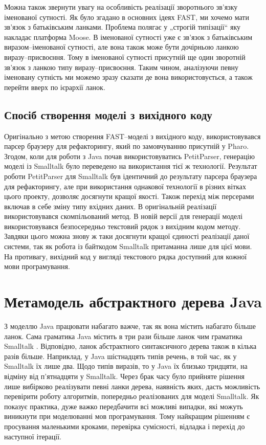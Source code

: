 \documentclass[12pt,a4paper]{article}
\begin{document}
Можна також звернути увагу на особливість реалізації зворотнього зв'язку іменованої сутності. Як було згадано в основних ідеях FAST, ми хочемо мати зв'язок з батьківським ланками. Проблема полягає у „строгій типізації“ яку накладає платформа Moose. В іменованої сутності уже є зв'язок з батьківським виразом--іменованої сутності, але вона також може бути дочірньою ланкою виразу--присвоєння. Тому в іменованої сутності присутній ще один зворотній зв'язок з ланкою типу виразу--присвоєння. Таким чином, аналізуючи певну іменовану сутність ми можемо зразу сказати де вона використовується, а також перейти вверх по ієрархії ланок. 

\subsection{Спосіб створення моделі з вихідного коду}
Оригінально з метою створення FAST--моделі з вихідного коду, використовувався парсер браузеру для рефакторингу, який по замовчуванню присутній у Pharo. Згодом, коли для роботи з Java почав використовуватись PetitParser, генерацію моделі із Smalltalk було переведено на використання тієї ж технології. Результат роботи PetitParser для Smalltalk був ідентичний до результату парсера браузера для рефакторингу, але при використання однакової технології в різних вітках цього проекту, дозволяє досягнути кращої якості. Також перехід між персерами включав в себе зміну типу вхідних даних. В оригінальній реалізації використовувався скомпільований метод. В новій версії для генерації моделі використовувався безпосередньо текстовий рядок з вихідним кодом методу. Завдяки цього можна знову ж таки досягнути кращої єдиності реалізації даної системи, так як робота із байткодом Smalltalk притаманна лише для цієї мови. На противагу, вихідний код у вигляді текстового рядка доступний для кожної мови програмування.

\clearpage

\section{Метамодель абстрактного дерева Java}

З моделлю Java працювати набагато важче, так як вона містить набагато більше ланок. Сама граматика Java містить в три рази більше ланок чим граматика Smalltalk \cite{meet-grammars}. Відповідно, ланок абстрактного синтаксичного дерева також в кілька разів більше. Наприклад, у Java шістнадцять типів речень, в той час, як у Smalltalk їх лише два. Щодо типів виразів, то у Java їх близько тридцяти, на відміну від п'ятнадцяти у Smalltalk. Через брак часу було прийняте рішення лише вибірково реалізувати певні ланки дерева, наявність яких, дасть можливість перевірити роботу алгоритмів, попередньо реалізованих для моделі Smalltalk. Як показує практика, дуже важко передбачити всі можливі випадки, які можуть виникнути при моделюванні мов програмування. Тому найкращим рішенням є просування маленькими кроками, перевірка сумісності, відладка і перехід до наступної ітерації.
\end{document}
